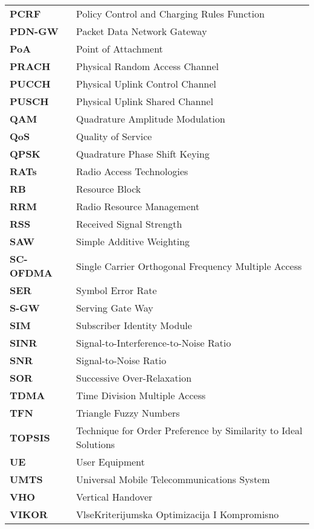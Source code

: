 \begin{table}[h] \centering
\begin{adjustbox}{max width=\textwidth}
\begin{tabular}{ll}	
\textbf{PCRF}&Policy Control and Charging Rules Function \\	
\textbf{PDN-GW}&Packet Data Network Gateway\\
\textbf{PoA}& Point of Attachment\\		
\textbf{PRACH}&Physical Random Access Channel \\			
\textbf{PUCCH}&Physical Uplink Control Channel \\			
\textbf{PUSCH}&Physical Uplink Shared Channel \\			
\textbf{QAM}&Quadrature Amplitude Modulation \\			
\textbf{QoS}&Quality of Service \\			
\textbf{QPSK}&Quadrature  Phase Shift Keying \\			
\textbf{RATs}&Radio Access Technologies\\  		 
\textbf{RB}&Resource Block \\			
\textbf{RRM}&Radio Resource Management\\	
\textbf{RSS}&Received Signal Strength \\		
\textbf{SAW}&Simple Additive Weighting\\			
\textbf{SC-OFDMA}&Single Carrier Orthogonal Frequency Multiple Access \\		
\textbf{SER}&Symbol Error Rate\\			
\textbf{S-GW}&Serving Gate Way\\			
\textbf{SIM}&Subscriber Identity Module\\	
\textbf{SINR}&Signal-to-Interference-to-Noise Ratio \\	
\textbf{SNR}& Signal-to-Noise Ratio \\	
\textbf{SOR}&Successive Over-Relaxation \\			
\textbf{TDMA}&Time Division Multiple Access\\			
\textbf{TFN}&Triangle Fuzzy Numbers \\			
\textbf{TOPSIS}&Technique for Order Preference by Similarity to Ideal Solutions\\		
\textbf{UE}&User Equipment \\		
\textbf{UMTS}&Universal Mobile Telecommunications System \\	
\textbf{VHO}&Vertical Handover \\ 		
\textbf{VIKOR}&VlseKriterijumska Optimizacija I Kompromisno \\	

\end{tabular}
\end{adjustbox}
\end{table}
